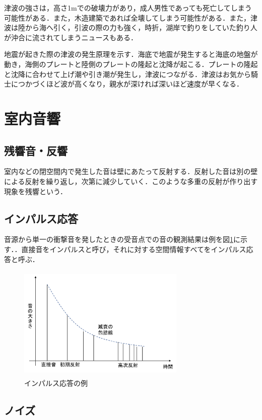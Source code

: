 \documentclass[a4j,11pt]{jsarticle}
\begin{document}
津波の強さは，高さ1mでの破壊力があり，成人男性であっても死亡してしまう可能性がある．また，木造建築であれば全壊してしまう可能性がある．また，津波は陸から海へ引く，引波の際の力も強く，時折，湖岸で釣りをしていた釣り人が沖合に流されてしまうニュースもある．

地震が起きた際の津波の発生原理を示す．海底で地震が発生すると海底の地盤が動き，海側のプレートと陸側のプレートの隆起と沈降が起こる．プレートの隆起と沈降に合わせて上げ潮や引き潮が発生し，津波につながる．津波はお気から騎士につかづくほど波が高くなり，親水が深ければ深いほど速度が早くなる．

\newpage

\section{室内音響}
\subsection{残響音・反響}
室内などの閉空間内で発生した音は壁にあたって反射する．反射した音は別の壁による反射を繰り返し，次第に減少していく．このような多重の反射が作り出す現象を残響という．

\subsection{インパルス応答}
音源から単一の衝撃音を発したときの受音点での音の観測結果は例を図\ref{fig:impulse}に示す．．直接音をインパルスと呼び，それに対する空間情報すべてをインパルス応答と呼ぶ\cite{oka3}．

\begin{figure}[h]
\begin{center}
 \includegraphics[clip,width=80mm,height=55mm]{ImpulseResponse.pdf}
\end{center}
 \caption{インパルス応答の例\cite{oka2}}
 \label{fig:impulse}
\end{figure}

\subsection{ノイズ}
\end{document}
